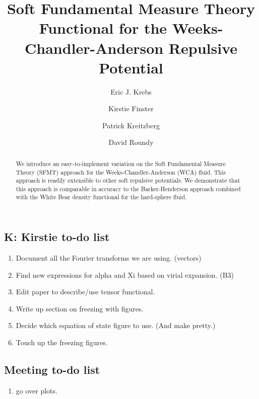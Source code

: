 \documentclass[letterpaper,twocolumn,amsmath,amssymb,prb]{revtex4-1}
\newcommand\kirstiesays[1]{{\bf \color{red}K: #1}}
\begin{document}
\title{Soft Fundamental Measure Theory Functional for the
  Weeks-Chandler-Anderson Repulsive Potential}

\author{Eric J. Krebs}

\author{Kirstie Finster}

\author{Patrick Kreitzberg}

\author{David Roundy}

\begin{abstract}
  We introduce an easy-to-implement variation on the Soft Fundamental
  Measure Theory (SFMT) approach for the Weeks-Chandler-Anderson (WCA)
  fluid.  This approach is readily extensible to other soft repulsive
  potentials.  We demonstrate that this approach is comparable in
  accuracy to the Barker-Henderson approach combined with the White
  Bear density functional for the hard-sphere fluid.
\end{abstract}

\maketitle

\subsection{\kirstiesays{Kirstie to-do list}}
\begin{enumerate}
\item Document all the Fourier transforms we are using. (vectors)
\item Find new expressions for alpha and Xi based on virial expansion. (B3)
\item Edit paper to describe/use tensor functional.
\item Write up section on freezing with figures.
\item Decide which equation of state figure to use. (And make pretty.)
\item Touch up the freezing figures.
 
\end{enumerate}

\subsection{Meeting to-do list}
\begin{enumerate}
\item go over plots.
\end{enumerate}
\end{document}

